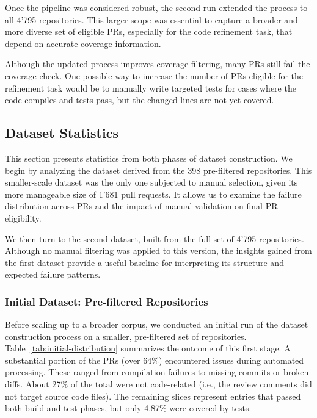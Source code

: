 Once the pipeline was considered robust, the second run extended the process to all 4'795
repositories. This larger scope was essential to capture a broader and more diverse set of eligible
PRs, especially for the code refinement task, that depend on accurate coverage information.

Although the updated process improves coverage filtering, many PRs still fail the coverage check.
One possible way to increase the number of PRs eligible for the refinement task would be to manually
write targeted tests for cases where the code compiles and tests pass, but the changed lines are not
yet covered.

\subsection{Dataset Statistics}

This section presents statistics from both phases of dataset construction. We begin by analyzing the
dataset derived from the 398 pre-filtered repositories. This smaller-scale dataset was the only one
subjected to manual selection, given its more manageable size of 1'681 pull requests. It allows us
to examine the failure distribution across PRs and the impact of manual validation on final PR
eligibility.

We then turn to the second dataset, built from the full set of 4'795 repositories. Although no
manual filtering was applied to this version, the insights gained from the first dataset provide a
useful baseline for interpreting its structure and expected failure patterns.

\subsubsection{Initial Dataset: Pre-filtered Repositories}

Before scaling up to a broader corpus, we conducted an initial run of the dataset construction
process on a smaller, pre-filtered set of repositories. Table~\ref{tab:initial-distribution}
summarizes the outcome of this first stage. A substantial portion of the PRs (over 64\%) encountered
issues during automated processing. These ranged from compilation failures to missing commits or
broken diffs. About 27\% of the total were not code-related (i.e., the review comments did not
target source code files). The remaining slices represent entries that passed both build and test
phases, but only 4.87\% were covered by tests.

